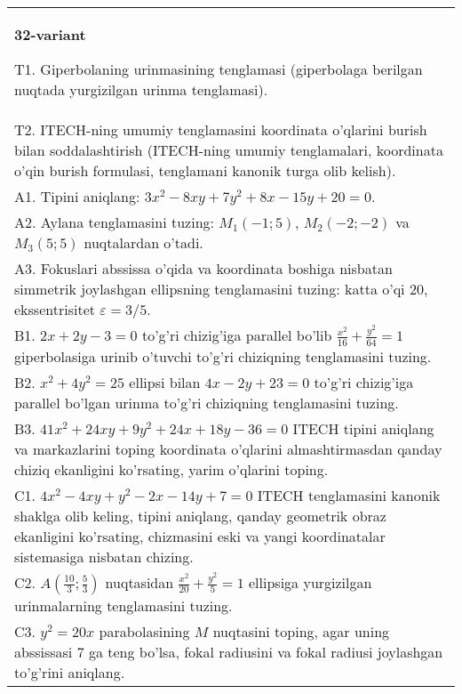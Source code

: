 \documentclass{article}
\begin{document}
\begin{tabular}{m{17cm}}
\textbf{32-variant}
\newline

T1. Giperbolaning urinmasining tenglamasi (giperbolaga berilgan nuqtada yurgizilgan urinma tenglamasi).\\

T2. ITECH-ning umumiy tenglamasini koordinata o'qlarini burish bilan soddalashtirish (ITECH-ning umumiy tenglamalari, koordinata o'qin burish formulasi, tenglamani kanonik turga olib kelish).\\

A1. Tipini aniqlang: $3x^{2}-8xy+7y^{2}+8x-15y+20=0$.\\

A2. Aylana tenglamasini tuzing: $M_1(-1;5)$, $M_2(-2;-2)$ va $M_3(5;5)$ nuqtalardan o'tadi.\\

A3. Fokuslari abssissa o'qida va koordinata boshiga nisbatan simmetrik joylashgan ellipsning tenglamasini tuzing: katta o'qi $20$, ekssentrisitet $\varepsilon=3/5$.\\

B1. $2x + 2y - 3 = 0$ to'g'ri chizig'iga parallel bo'lib $\frac{x^{2}}{16} + \frac{y^{2}}{64} = 1$ giperbolasiga urinib o'tuvchi to'g'ri chiziqning tenglamasini tuzing.  \\

B2. $x^{2} + 4y^{2} = 25$ ellipsi bilan $4x - 2y + 23 = 0$ to'g'ri chizig'iga parallel bo'lgan urinma to'g'ri chiziqning tenglamasini tuzing.  \\

B3. $41x^{2} + 24xy + 9y^{2} + 24x + 18y - 36 = 0$ ITECH tipini aniqlang va markazlarini toping koordinata o'qlarini almashtirmasdan qanday chiziq ekanligini ko'rsating, yarim o'qlarini toping.  \\

C1. $4x^{2} - 4xy + y^{2} - 2x - 14y + 7 = 0$ ITECH tenglamasini kanonik shaklga olib keling, tipini aniqlang, qanday geometrik obraz ekanligini ko'rsating, chizmasini eski va yangi koordinatalar sistemasiga nisbatan chizing.  \\

C2. $A(\frac{10}{3};\frac{5}{3})$ nuqtasidan $\frac{x^{2}}{20} + \frac{y^{2}}{5} = 1$ ellipsiga yurgizilgan urinmalarning tenglamasini tuzing.  \\

C3. $y^{2} = 20x$ parabolasining $M$ nuqtasini toping, agar uning abssissasi 7 ga teng bo'lsa, fokal radiusini va fokal radiusi joylashgan to'g'rini aniqlang.\\

\end{tabular}
\vspace{1cm}
\end{document}
